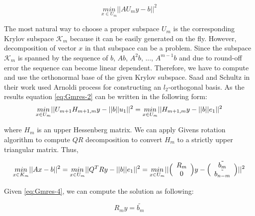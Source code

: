 \begin{equation} \label{eq:Gmres-2}
	\underset{x \in U_m}{min}||AU_m y - b||^2
\end{equation}

The most natural way to choose a proper subspace $U_m$ is the corresponding Krylov subspace $\mathcal{K}_m$ because it can be easily generated on the fly. However, decomposition of vector $x$ in that subspace can be a problem. Since the subspace $\mathcal{K}_m$ is spanned by the sequence of $b$, $Ab$, $A^2b$, ..., $A^{m-1}b$ and due to round-off error the sequence can become linear dependent. Therefore, we have to compute and use the orthonormal base of the given Krylov subspace. Saad and Schultz in their work \cite{sparse-la:gmrese-origin} used Arnoldi process for constructing an $l_2$-orthogonal basis. As the results equation \ref{eq:Gmres-2} can be written in the following form:  \\

\begin{equation} \label{eq:Gmres-3}
	\underset{x \in U_m}{min}||U_{m+1}H_{m+1,m} y - ||b||u_1||^2 = \\
	\underset{x \in U_m}{min}||H_{m+1,m} y - ||b||e_1||^2 
\end{equation}

where $H_m$ is an upper Hessenberg matrix. We can apply Givens rotation algorithm to compute $QR$ decomposition to convert $H_m$ to a strictly upper triangular matrix. Thus,

 
\begin{equation} \label{eq:Gmres-4}
	\underset{x \in K_m}{min}||Ax - b||^2 = \\
	\underset{x \in U_m}{min}||Q^TRy - ||b||e_1||^2 = \\
	\underset{x \in U_m}{min}||\Big(\begin{array}{c c}R_m \\ 0 \\\end{array}\Big) y - \Big(\begin{array}{c c} \tilde{b_m} \\ \tilde{b_{n-m}} \\\end{array}\Big)||^2
\end{equation}

Given \ref{eq:Gmres-4}, we can compute the solution as following:

\begin{equation} \label{eq:Gmres-5}
	R_m y = \tilde{b_m}
\end{equation}


